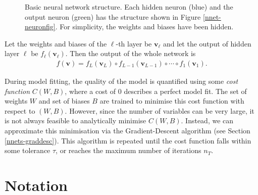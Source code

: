 \begin{figure}
\caption{Basic neural network structure. Each hidden neuron (blue) and the output neuron (green) has the structure shown in Figure \ref{nnet-neuronfig}. For simplicity, the weights and biases have been hidden.}
\label{nnet-structurefig}
\end{figure}

Let the weights and biases of the $\ell$-th layer be $\mathbf{v}_\ell$ and let the output of hidden layer $\ell$ be $f_\ell(\mathbf{v}_\ell)$. Then the output of the whole network is
\begin{align}
	f(\mathbf{v}) = f_L(\mathbf{v}_L) \circ f_{L-1}(\mathbf{v}_{L-1}) \circ \cdots \circ f_1(\mathbf{v}_1).
\end{align}

During model fitting, the quality of the model is quantified using some \textit{cost function} $C(W,B)$, where a cost of 0 describes a perfect model fit. The set of weights $W$ and set of biases $B$ are trained to minimise this cost function with respect to $(W,B)$. However, since the number of variables can be very large, it is not always feasible to analytically minimise $C(W,B)$. Instead, we can approximate this minimisation via the Gradient-Descent algorithm (see Section \ref{nnets-graddesc}). This algorithm is repeated until the cost function falls within some tolerance $\tau$, or reaches the maximum number of iterations $n_T$.

\section{Notation}\label{nnets-not}



